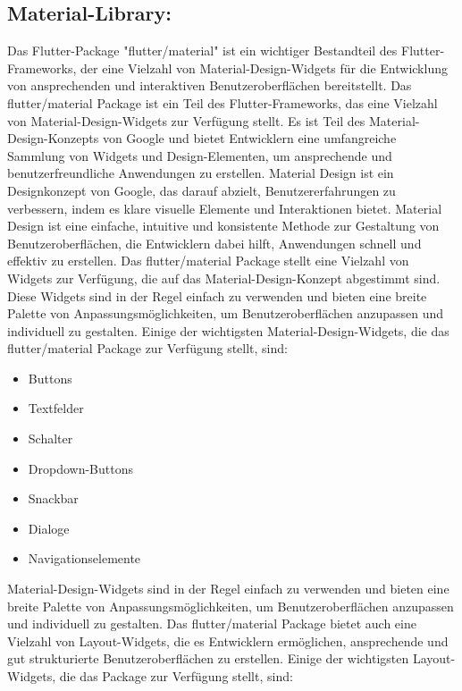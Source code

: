 \subsection*{Material-Library:}
Das Flutter-Package "flutter/material" ist ein wichtiger Bestandteil des Flutter-Frameworks, der eine Vielzahl von Material-Design-Widgets für die Entwicklung von ansprechenden und interaktiven Benutzeroberflächen bereitstellt. 
Das flutter/material Package ist ein Teil des Flutter-Frameworks, das eine Vielzahl von Material-Design-Widgets zur Verfügung stellt. 
Es ist Teil des Material-Design-Konzepts von Google und bietet Entwicklern eine umfangreiche Sammlung von Widgets und Design-Elementen, um ansprechende und benutzerfreundliche Anwendungen zu erstellen.
Material Design ist ein Designkonzept von Google, das darauf abzielt, Benutzererfahrungen zu verbessern, indem es klare visuelle Elemente und Interaktionen bietet. 
Material Design ist eine einfache, intuitive und konsistente Methode zur Gestaltung von Benutzeroberflächen, die Entwicklern dabei hilft, Anwendungen schnell und effektiv zu erstellen.
\newline
Das flutter/material Package stellt eine Vielzahl von Widgets zur Verfügung, die auf das Material-Design-Konzept abgestimmt sind. 
Diese Widgets sind in der Regel einfach zu verwenden und bieten eine breite Palette von Anpassungsmöglichkeiten, um Benutzeroberflächen anzupassen und individuell zu gestalten.
Einige der wichtigsten Material-Design-Widgets, die das flutter/material Package zur Verfügung stellt, sind:
\begin{itemize}
    \item Buttons
    \item Textfelder
    \item Schalter
    \item Dropdown-Buttons
    \item Snackbar
    \item Dialoge
    \item Navigationselemente
\end{itemize}
Material-Design-Widgets sind in der Regel einfach zu verwenden und bieten eine breite Palette von Anpassungsmöglichkeiten, 
um Benutzeroberflächen anzupassen und individuell zu gestalten.
\newline
Das flutter/material Package bietet auch eine Vielzahl von Layout-Widgets, die es Entwicklern ermöglichen, ansprechende und gut strukturierte Benutzeroberflächen zu erstellen. 
Einige der wichtigsten Layout-Widgets, die das Package zur Verfügung stellt, sind:

